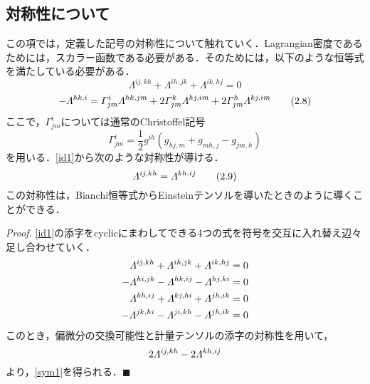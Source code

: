 \documentclass[main]{subfiles}
\begin{document}
\subsection{対称性について}
この項では，定義した記号の対称性について触れていく．Lagrangian密度であるためには，スカラー函数である必要がある．そのためには，以下のような恒等式を満たしている必要がある．
\begin{equation*}
    \varLambda^{ij,kh}+\varLambda^{ih,jk}+\varLambda^{ik,hj}=0
    \tag{2.7} \label{id1}
\end{equation*}
\begin{equation*}
    -\varLambda^{hk,i} = \varGamma^i_{jm} \varLambda^{hk,jm}+2\varGamma^k_{jm} \varLambda^{hj,im}+2\varGamma^h_{jm} \varLambda^{kj,im}
    \tag{2.8} \label{id2}
\end{equation*}
ここで，\(\varGamma^i_{jm}\)については通常のChristoffel記号
\begin{equation*}
    \varGamma^i_{jm} = \dfrac{1}{2}g^{ih}(g_{hj,m}+g_{mh,j}-g_{jm,h})
\end{equation*}
を用いる．\eqref{id1}から次のような対称性が導ける．
\begin{equation*}
    \varLambda^{ij,kh} = \varLambda^{kh,ij}
    \tag{2.9} \label{sym1}
\end{equation*}
この対称性は，Bianchi恒等式からEinsteinテンソルを導いたときのように導くことができる．

\textit{Proof.} \eqref{id1}の添字をcyclicにまわしてできる4つの式を符号を交互に入れ替え辺々足し合わせていく．
\begin{align*}
    \varLambda^{ij,kh}+\varLambda^{ih,jk}+\varLambda^{ik,hj}  & = 0 \\
    -\varLambda^{hi,jk}-\varLambda^{hk,ij}-\varLambda^{hj,ki} & = 0 \\
    \varLambda^{kh,ij}+\varLambda^{kj,hi}+\varLambda^{jh,ik}  & = 0 \\
    -\varLambda^{jk,hi}-\varLambda^{ji,kh}-\varLambda^{jh,ik} & = 0
\end{align*}
このとき，偏微分の交換可能性と計量テンソルの添字の対称性を用いて，
\begin{equation*}
    2\varLambda^{ij,kh}-2\varLambda^{kh,ij}
\end{equation*}
より，\eqref{sym1}を得られる．\(\blacksquare\)
\end{document}
